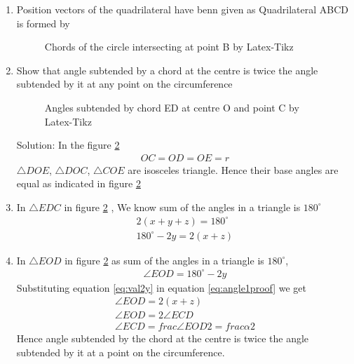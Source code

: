 \renewcommand{\theequation}{\theenumi}
\begin{enumerate}[label=\thesection.\arabic*.,ref=\thesection.\theenumi]

\item Position vectors of the quadrilateral have benn given as
Quadrilateral ABCD is formed by 
\begin{figure}[!ht]
\centering
\resizebox{\columnwidth}{!}{}
\caption{Chords of the circle intersecting at point B by Latex-Tikz}
\label{fig:intersecting_chords}	
\end{figure}

\item Show that angle subtended by a chord at the centre is twice the angle subtended by it at any point on the circumference
\begin{figure}[!ht]
\centering
\resizebox{\columnwidth}{!}{}
\caption{Angles subtended by chord ED at centre O and point C by Latex-Tikz}
\label{fig:chord_proof}	
\end{figure}
Solution:
\newline
In the figure \ref{fig:chord_proof}	
\begin{align}
OC = OD = OE = r
\end{align}
\implies $\triangle DOE$, $\triangle DOC$, $\triangle COE$ are isosceles triangle.
\newline
Hence their base angles are equal as indicated in figure \ref{fig:chord_proof}

\item In $\triangle EDC$ in figure \ref{fig:chord_proof} , We know sum of the angles in a triangle is $180^{\circ}$
\begin{align}
2(x+y+z) = 180^{\circ}
\\
180^{\circ} - 2y = 2(x+z)
\label{eq:val2y}
\end{align}

\item In $\triangle EOD$ in figure \ref{fig:chord_proof} as sum of the angles in a triangle is $180^{\circ}$,
\begin{align}
\angle EOD = 180^{\circ} - 2y
\label{eq:angle1proof}
\end{align}
Substituting equation \ref{eq:val2y} in equation \ref{eq:angle1proof} we get 
\begin{align}
\angle EOD = 2(x+z)
\\
\angle EOD = 2 \angle ECD
\\
\angle ECD = frac{\angle EOD}{2} = frac{\alpha}{2}
\label{eq:angle1}
\end{align}
Hence angle subtended by the chord at the centre is twice the angle subtended by it at a point on the circumference.


\end{enumerate}
